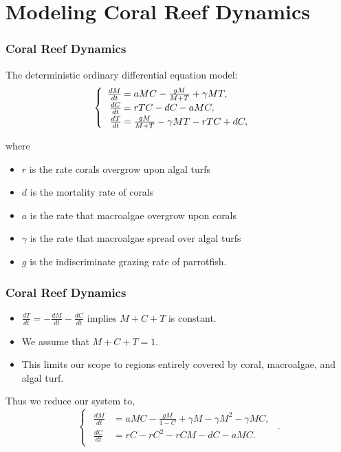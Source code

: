 \documentclass{beamer}
\begin{document}
\section{Modeling Coral Reef Dynamics}

\begin{frame}\frametitle{Coral Reef Dynamics}
The deterministic ordinary differential equation model:
$$\begin{cases}\begin{array}{rl}
\frac{dM}{dt}\hspace{-.8em}&=aMC - \frac{gM}{M+T} + \gamma M T, \\
\frac{dC}{dt}\hspace{-.8em}&=rTC - dC - aMC, \\
\frac{dT}{dt}\hspace{-.8em}&=\frac{gM}{M + T} - \gamma MT - rTC + dC, 
\end{array}\end{cases}$$ 

where 
\begin{itemize}\itemsep0pt
\item $r$ is the rate corals overgrow upon algal turfs\\
\item $d$ is the mortality rate of corals\\
\item $a$ is the rate that macroalgae overgrow upon corals\\
\item $\gamma$ is the rate that macroalgae spread over algal turfs\\
\item $g$ is the indiscriminate grazing rate of parrotfish.
\end{itemize}
\end{frame}

\begin{frame}\frametitle{Coral Reef Dynamics}

\hspace{1.57em}

\begin{itemize}
\item $\frac{dT}{dt}=-\frac{dM}{dt}-\frac{dC}{dt}$ implies $M+C+T$ is
  constant.
\item We assume that $M+C+T=1$.
\item This limits our scope to regions entirely covered by coral,
  macroalgae, and algal turf. 
\end{itemize}

Thus we reduce our system to, 
$$\begin{cases}
\begin{array}{rl}
\frac{dM}{dt}&= aMC-\frac{gM}{1-C} + \gamma M - \gamma M^2 -\gamma M C,\\
\frac{dC}{dt}&=rC - rC^2 - rCM - dC - aMC.
\end{array} 
\end{cases}.$$
\end{frame}
\end{document}
